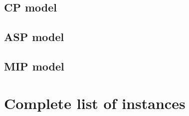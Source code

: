 \newpage


\newpage

\newpage



\subsection{CP model}\label{appendix:CP}
\vspace{-0.6cm}

\subsection{ASP model}\label{appendix:ASP}

%
\subsection{MIP model}\label{appendix:MIP}
\vspace{-0.5cm}

\section{Complete list of instances}\label{appendix:instances}
